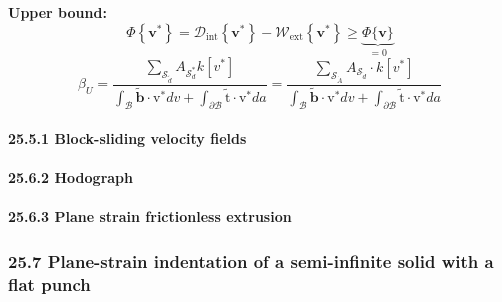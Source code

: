 \textbf{Upper bound:} \[
\Phi\left\{\mathbf{v}^{*}\right\}=\mathcal{D}_{\mathrm{int}}\left\{\mathbf{v}^{*}\right\}-\mathcal{W}_{\mathrm{ext}}\left\{\mathbf{v}^{*}\right\} \ge\underbrace{\Phi\{\mathbf{v}\}}_{=0}
\] \[
\beta_{U}=\frac{\sum_{\mathcal{S}_{\tilde{d}}} A_{\mathcal{S}_{d}^{*}} k\left[v^{*}\right]}{\int_{\mathcal{B}} \tilde{\mathbf{b}} \cdot \mathrm{v}^{*} d v+\int_{\partial \mathcal{B}} \tilde{\mathrm{t}} \cdot \mathrm{v}^{*} d a}=\frac{\sum_{\mathcal{S}_{\dot{A}}} A_{\mathcal{S}_{\dot{d}}} \cdot k\left[v^{*}\right]}{\int_{\mathcal{B}} \tilde{\mathbf{b}} \cdot \mathrm{v}^{*} d v+\int_{\partial \mathcal{B}} \tilde{\mathrm{t}} \cdot \mathrm{v}^{*} d a}
\]

\hypertarget{block-sliding-velocity-fields}{%
\paragraph{25.5.1 Block-sliding velocity
fields}\label{block-sliding-velocity-fields}}

\hypertarget{hodograph}{%
\paragraph{25.6.2 Hodograph}\label{hodograph}}

\hypertarget{plane-strain-frictionless-extrusion}{%
\paragraph{25.6.3 Plane strain frictionless
extrusion}\label{plane-strain-frictionless-extrusion}}

\hypertarget{plane-strain-indentation-of-a-semi-infinite-solid-with-a-flat-punch}{%
\subsubsection{25.7 Plane-strain indentation of a semi-infinite solid
with a flat
punch}\label{plane-strain-indentation-of-a-semi-infinite-solid-with-a-flat-punch}}
